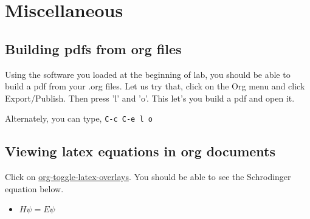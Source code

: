 \documentclass[11pt]{article}
\begin{document}
\section{Miscellaneous}
\label{sec-9}

\subsection{Building pdfs from org files}
\label{sec-9-1}

Using the software you loaded at the beginning of lab, you should be able to build a pdf from your .org files. Let us try that, click on the Org menu and click Export/Publish. Then press 'l' and 'o'. This let's you build a pdf and open it.

Alternately, you can type, \verb~C-c C-e l o~


\subsection{Viewing latex equations in org documents}
\label{sec-9-2}

Click on \url{org-toggle-latex-overlays}. You should be able to see the Schrodinger equation below.

\begin{itemize}
\item $H\psi = E\psi$
\end{itemize}
\end{document}
